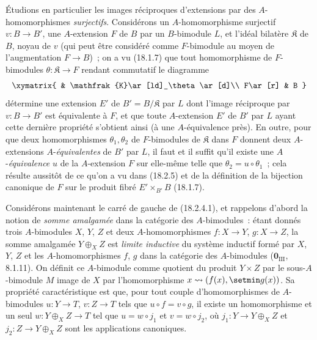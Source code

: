 \begin{env}[18.2.6]
\label{0.18.2.6-fr}
Étudions en particulier les images réciproques d'extensions par des
$A$-homomorphismes \emph{surjectifs}. Considérons un $A$-homomorphisme
surjectif $v:B\to B'$, une $A$-extension $F$ de $B$ par un $B$-bimodule $L$,
et l'idéal bilatère $\mathfrak{K}$ de $B$, noyau de $v$ (qui peut être
considéré comme $F$-bimodule au moyen de l'augmentation $F\to B$)~; on a vu
(18.1.7) que tout homomorphisme de $F$-bimodules
$\theta:\mathfrak{K}\to F$ rendant commutatif le diagramme
\[
  \xymatrix{
    & \mathfrak{K}\ar[ld]_\theta\ar[d]\\
    F\ar[r] & B
  }
\]
détermine une extension $E'$ de $B'=B/\mathfrak{K}$ par $L$ dont l'image
réciproque par $v:B\to B'$ est équivalente à $F$, et que toute $A$-extension
$E'$ de $B'$ par $L$ ayant cette dernière propriété s'obtient ainsi (à une
$A$-équivalence près). En outre, pour que deux homomorphismes
$\theta_1,\theta_2$ de $F$-bimodules de $\mathfrak{K}$ dans $F$ donnent deux
  $A$-extensions $A$-\emph{équivalentes} de $B'$ par $L$, il faut et il suffit qu'il
existe une $A$-\emph{équivalence} $u$ de la $A$-extension $F$ sur elle-même telle que
$\theta_2=u\circ\theta_1$~; cela résulte aussitôt de ce qu'on a vu dans
(18.2.5) et de la définition de la bijection canonique de $F$ sur le produit
fibré $E'\times_{B'}B$ (18.1.7).
\end{env}

\begin{env}[18.2.7]
\label{0.18.2.7-fr}
Considérons maintenant le carré de gauche de (18.2.4.1), et rappelons d'abord
la notion de \emph{somme amalgamée} dans la catégorie des $A$-bimodules~:
étant donnés trois $A$-bimodules $X$, $Y$, $Z$ et deux $A$-homomorphismes
$f:X\to Y$, $g:X\to Z$, la somme amalgamée $Y\oplus_XZ$ est \emph{limite
inductive} du système inductif formé par $X$, $Y$, $Z$ et les
$A$-homomorphismes $f$, $g$ dans la catégorie des $A$-bimodules
($\mathbf{0}_{\mathrm{III}}$, 8.1.11). On définit ce $A$-bimodule comme quotient du
produit $Y\times Z$ par le sous-$A$-bimodule $M$ image de $X$ par
l'homomorphisme $x\leadsto(f(x),\setmin g(x))$. Sa propriété caractéristique est que,
pour tout couple d'homomorphismes de $A$-bimodules $u:Y\to T$, $v:Z\to T$
tels que $u\circ f=v\circ g$, il existe un homomorphisme et un seul
$w:Y\oplus_XZ\to T$ tel que $u=w\circ j_1$ et $v=w\circ j_2$, où
$j_1:Y\to Y\oplus_XZ$ et $j_2:Z\to Y\oplus_XZ$ sont les applications
canoniques.
\end{env}

